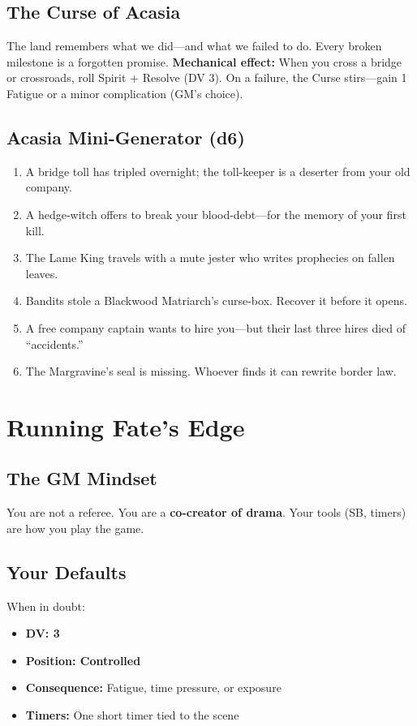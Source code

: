 \documentclass[10pt,twocolumn]{article} %
\begin{document}
\subsection{The Curse of Acasia}
The land remembers what we did---and what we failed to do. Every broken milestone is a forgotten promise.
\textbf{Mechanical effect:} When you cross a bridge or crossroads, roll Spirit + Resolve (DV 3). On a failure, the Curse stirs---gain 1 Fatigue or a minor complication (GM's choice).

\subsection{Acasia Mini-Generator (d6)}
\begin{enumerate}[leftmargin=*]
    \item A bridge toll has tripled overnight; the toll-keeper is a deserter from your old company.
    \item A hedge-witch offers to break your blood-debt---for the memory of your first kill.
    \item The Lame King travels with a mute jester who writes prophecies on fallen leaves.
    \item Bandits stole a Blackwood Matriarch's curse-box. Recover it before it opens.
    \item A free company captain wants to hire you---but their last three hires died of ``accidents.''
    \item The Margravine's seal is missing. Whoever finds it can rewrite border law.
\end{enumerate}

\section{Running Fate's Edge}

\subsection{The GM Mindset}
You are not a referee. You are a \textbf{co-creator of drama}. Your tools (SB, timers) are how you play the game.

\subsection{Your Defaults}
When in doubt:
\begin{itemize}[leftmargin=*]
    \item \textbf{DV: 3}
    \item \textbf{Position: Controlled}
    \item \textbf{Consequence:} Fatigue, time pressure, or exposure
    \item \textbf{Timers:} One short timer tied to the scene
\end{itemize}
\end{document}
